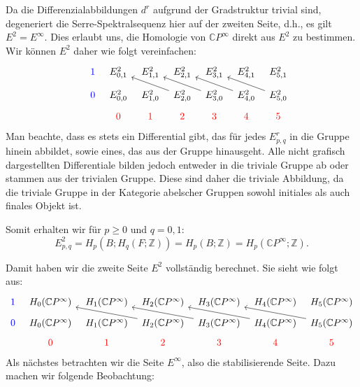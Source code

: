 \documentclass[12pt]{article}
\numberwithin{conj}{section}
\begin{document}
    Da die Differenzialabbildungen $d^{r}$ aufgrund der Gradstruktur trivial sind,
    degeneriert die Serre-Spektralsequenz hier auf der zweiten Seite, d.h., es gilt
    $E^{2} = E^{\infty}$. Dies erlaubt uns, die Homologie von $\mathbb{C}P^{\infty}$
    direkt aus $E^{2}$ zu bestimmen. Wir können $E^{2}$ daher wie folgt vereinfachen:
    \[
        \begin{tikzcd}
            [sep=tiny] {\color{blue}} & {\color{blue}1} & {E^2_{0,1}} & {E^2_{1,1}} &
            {E^2_{2,1}} & {E^2_{3,1}} & {E^2_{4,1}} & {E^2_{5,1}} \\ & {\color{blue}0}
            & {E^2_{0,0}} & {E^2_{1,0}} & {E^2_{2,0}} & {E^2_{3,0}} & {E^2_{4,0}} & {E^2_{5,0}}
            \\ & {\color{red}} & {\color{red}0} & {\color{red}1} & {\color{red}2} & {\color{red}3}
            & {\color{red}4} & {\color{red}5} \arrow[from=2-5, to=1-3] \arrow[from=2-6,
            to=1-4] \arrow[from=2-7, to=1-5] \arrow[from=2-8, to=1-6]
        \end{tikzcd}
    \]
    Man beachte, dass es stets ein Differential gibt, das für jedes $E^{r}_{p,q}$
    in die Gruppe hinein abbildet, sowie eines, das aus der Gruppe hinausgeht. Alle
    nicht grafisch dargestellten Differentiale bilden jedoch entweder in die triviale
    Gruppe ab oder stammen aus der trivialen Gruppe. Diese sind daher die triviale
    Abbildung, da die triviale Gruppe in der Kategorie abelscher Gruppen sowohl initiales
    als auch finales Objekt ist.

    Somit erhalten wir für $p \geq 0$ und $q = 0,1$:
    \[
        E^{2}_{p,q}= H_{p}(B; H_{q}(F;\mathbb{Z}))  = H_{p}(B;\mathbb{Z}) = H_{p}(\mathbb{C}P^{\infty};\mathbb{Z}).
    \]

    Damit haben wir die zweite Seite $E^{2}$ vollständig berechnet. Sie sieht wie folgt
    aus:
    \[
        \begin{tikzcd}
            [sep=tiny] {\color{blue}1} & {H_0(\mathbb{C}P^\infty)} & {H_1(\mathbb{C}P^\infty)}
            & {H_2(\mathbb{C}P^\infty)} & {H_3(\mathbb{C}P^\infty)} & {H_4(\mathbb{C}P^\infty)}
            & {H_5(\mathbb{C}P^\infty)} \\ {\color{blue}0} & {H_0(\mathbb{C}P^\infty)}
            & {H_1(\mathbb{C}P^\infty)} & {H_2(\mathbb{C}P^\infty)} & {H_3(\mathbb{C}P^\infty)}
            & {H_4(\mathbb{C}P^\infty)} & {H_5(\mathbb{C}P^\infty)} \\ & {\color{red}0}
            & {\color{red}1} & {\color{red}2} & {\color{red}3} & {\color{red}4} & {\color{red}5}
            \arrow[from=2-4, to=1-2] \arrow[from=2-5, to=1-3] \arrow[from=2-6, to=1-4]
            \arrow[from=2-7, to=1-5]
        \end{tikzcd}
    \]
    Als nächstes betrachten wir die Seite $E^{\infty}$, also die stabilisierende Seite.
    Dazu machen wir folgende Beobachtung:
\end{document}

